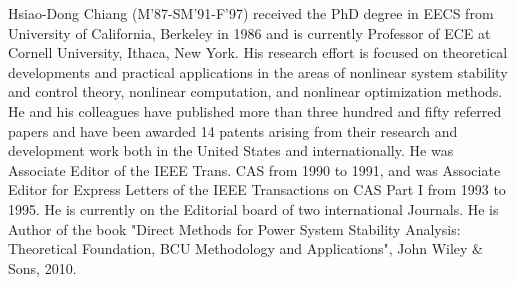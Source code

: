\documentclass[journal]{IEEEtran}
\begin{document}
\begin{IEEEbiography}{Hsiao-Dong Chiang}
(M'87-SM'91-F'97) received the PhD degree in EECS from University of California, Berkeley in 1986 and is currently Professor of ECE at Cornell University, Ithaca, New York. His research effort is focused on theoretical developments and practical applications in the areas of nonlinear system stability and control theory, nonlinear computation, and nonlinear optimization methods. He and his colleagues have published more than three hundred and fifty referred papers and have been awarded 14 patents arising from their research and development work both in the United States and internationally. He was Associate Editor of the IEEE Trans. CAS from 1990 to 1991, and was Associate Editor for Express Letters of the IEEE Transactions on CAS Part I from 1993 to 1995. He is currently on the Editorial board of two international Journals. He is Author of the book "Direct Methods for Power System Stability Analysis: Theoretical Foundation, BCU Methodology and Applications", John Wiley \& Sons, 2010.
\end{IEEEbiography}
\end{document}
